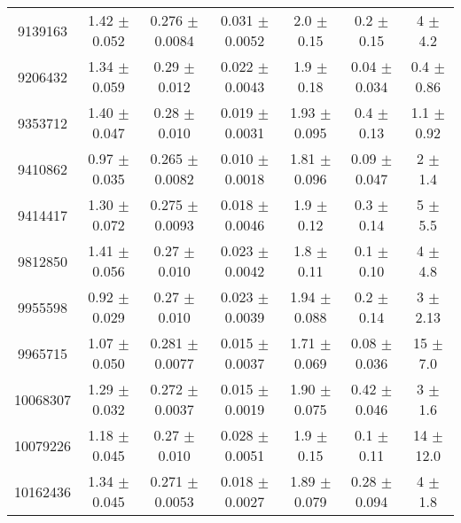 \documentclass[epjCONF,columns]{svjour} %
\begin{document}
\begin{table*}
\begin{tabular}{c|cccccc}
9139163  &        1.42   $\pm$  0.052    &        0.276  $\pm$  0.0084   &        0.031  $\pm$  0.0052   &        2.0    $\pm$  0.15     &        0.2    $\pm$  0.15     &        4      $\pm$  4.2      \\
9206432  &        1.34   $\pm$  0.059    &        0.29   $\pm$  0.012    &        0.022  $\pm$  0.0043   &        1.9    $\pm$  0.18     &        0.04   $\pm$  0.034    &        0.4    $\pm$  0.86     \\
9353712  &        1.40   $\pm$  0.047    &        0.28   $\pm$  0.010    &        0.019  $\pm$  0.0031   &        1.93   $\pm$  0.095    &        0.4    $\pm$  0.13     &        1.1    $\pm$  0.92     \\
9410862  &        0.97   $\pm$  0.035    &        0.265  $\pm$  0.0082   &        0.010  $\pm$  0.0018   &        1.81   $\pm$  0.096    &        0.09   $\pm$  0.047    &        2      $\pm$  1.4      \\
9414417  &        1.30   $\pm$  0.072    &        0.275  $\pm$  0.0093   &        0.018  $\pm$  0.0046   &        1.9    $\pm$  0.12     &        0.3    $\pm$  0.14     &        5      $\pm$  5.5      \\
9812850  &        1.41   $\pm$  0.056    &        0.27   $\pm$  0.010    &        0.023  $\pm$  0.0042   &        1.8    $\pm$  0.11     &        0.1    $\pm$  0.10     &        4      $\pm$  4.8      \\
9955598  &        0.92   $\pm$  0.029    &        0.27   $\pm$  0.010    &        0.023  $\pm$  0.0039   &        1.94   $\pm$  0.088    &        0.2    $\pm$  0.14     &        3      $\pm$  2.13     \\
9965715  &        1.07   $\pm$  0.050    &        0.281  $\pm$  0.0077   &        0.015  $\pm$  0.0037   &        1.71   $\pm$  0.069    &        0.08   $\pm$  0.036    &       15      $\pm$  7.0      \\
10068307 &        1.29   $\pm$  0.032    &        0.272  $\pm$  0.0037   &        0.015  $\pm$  0.0019   &        1.90   $\pm$  0.075    &        0.42   $\pm$  0.046    &        3      $\pm$  1.6      \\
10079226 &        1.18   $\pm$  0.045    &        0.27   $\pm$  0.010    &        0.028  $\pm$  0.0051   &        1.9    $\pm$  0.15     &        0.1    $\pm$  0.11     &        14     $\pm$  12.0     \\
10162436 &        1.34   $\pm$  0.045    &        0.271  $\pm$  0.0053   &        0.018  $\pm$  0.0027   &        1.89   $\pm$  0.079    &        0.28   $\pm$  0.094    &        4      $\pm$  1.8      \\

\end{tabular}
\end{table*}
\end{document}
